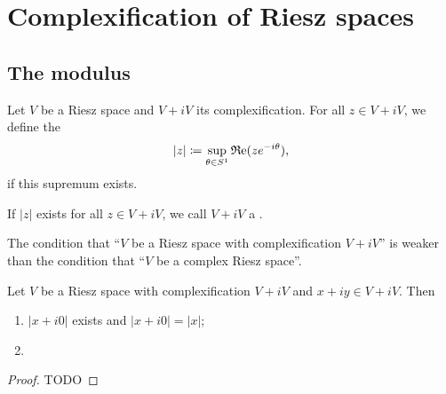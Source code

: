 \section{Complexification of Riesz spaces}
\subsection{The modulus}
\begin{definition}
Let $V$ be a Riesz space and $V+iV$ its complexification. For all $z\in V+iV$, we define the 
\[ |z| \coloneqq \sup_{\theta\in S^1} \operatorname{\mathfrak{R}e}(ze^{-i\theta}), \]
if this supremum exists.

If $|z|$ exists for all $z\in V+iV$, we call $V+iV$ a .
\end{definition}
The condition that ``$V$ be a Riesz space with complexification $V+iV$'' is weaker than the condition that ``$V$ be a complex Riesz space''.

\begin{lemma}
Let $V$ be a Riesz space with complexification $V+iV$ and $x+iy \in V + iV$. Then
\begin{enumerate}
\item $|x+i0|$ exists and $|x+i0| = |x|$;
\item 
\end{enumerate}
\end{lemma}
\begin{proof}
TODO
\end{proof}

